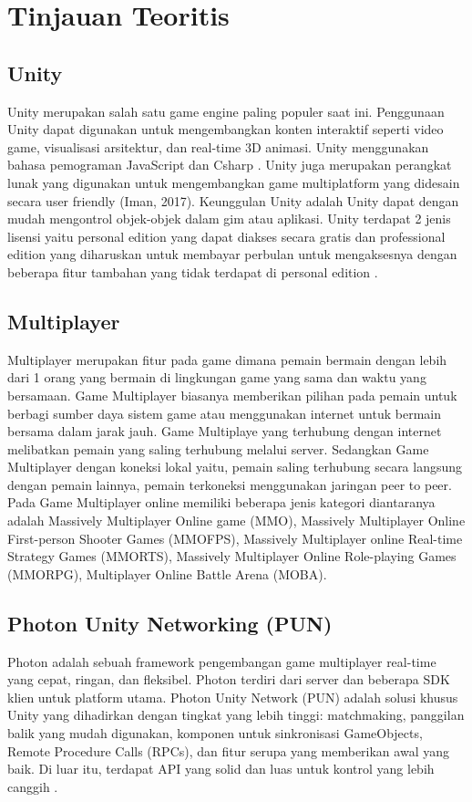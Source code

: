 \section{Tinjauan Teoritis}
\subsection{Unity}
Unity merupakan salah satu game engine paling populer saat ini. Penggunaan Unity dapat digunakan untuk mengembangkan konten interaktif seperti video game, 
visualisasi arsitektur, dan real-time 3D animasi. Unity menggunakan bahasa pemograman JavaScript dan 
Csharp \cite{Ansori}. Unity juga merupakan perangkat lunak yang digunakan untuk mengembangkan game multiplatform yang didesain secara user friendly 
(Iman, 2017). Keunggulan Unity adalah Unity 
dapat dengan mudah mengontrol objek-objek 
dalam gim atau aplikasi. Unity terdapat 2 jenis 
lisensi yaitu personal edition yang dapat diakses 
secara gratis dan professional edition yang 
diharuskan untuk membayar perbulan untuk 
mengaksesnya dengan beberapa fitur tambahan 
yang tidak terdapat di personal edition \cite{Sarwodi}. 

\subsection{Multiplayer}
Multiplayer merupakan fitur pada game dimana pemain bermain dengan lebih dari 1 orang yang bermain 
di lingkungan game yang sama dan waktu yang bersamaan. Game Multiplayer biasanya memberikan pilihan pada 
pemain untuk berbagi sumber daya sistem game atau menggunakan internet untuk bermain bersama dalam jarak 
jauh. Game Multiplaye yang terhubung dengan internet melibatkan pemain yang saling terhubung melalui server. 
Sedangkan Game Multiplayer dengan koneksi lokal yaitu, pemain saling terhubung secara langsung dengan 
pemain lainnya, pemain terkoneksi menggunakan jaringan peer to peer. Pada Game Multiplayer online memiliki 
beberapa jenis kategori diantaranya adalah Massively Multiplayer Online game (MMO), Massively Multiplayer 
Online First-person Shooter Games (MMOFPS), Massively Multiplayer online Real-time Strategy Games
(MMORTS), Massively Multiplayer Online Role-playing Games (MMORPG), Multiplayer Online Battle Arena
(MOBA).\cite{Ansori}

\subsection{Photon Unity Networking (PUN)}
Photon adalah sebuah framework pengembangan game multiplayer real-time yang cepat, ringan, dan fleksibel. Photon terdiri dari server dan beberapa SDK klien untuk platform utama.
Photon Unity Network (PUN) adalah solusi khusus Unity yang dihadirkan dengan tingkat yang lebih tinggi: matchmaking, panggilan balik yang mudah digunakan, komponen untuk sinkronisasi GameObjects, Remote Procedure Calls (RPCs), dan fitur serupa yang memberikan awal yang baik. Di luar itu, terdapat API yang solid dan luas untuk kontrol yang lebih canggih \cite{pun}.

